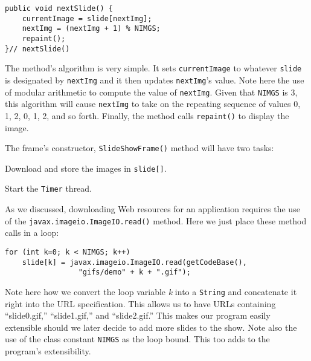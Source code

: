 \begin{jjjlisting}
\begin{lstlisting}
public void nextSlide() {
    currentImage = slide[nextImg];
    nextImg = (nextImg + 1) % NIMGS;
    repaint();
}// nextSlide()
\end{lstlisting}
\end{jjjlisting}

\noindent The method's algorithm is very simple.  It sets
{\tt currentImage} to whatever {\tt slide} is designated by
{\tt nextImg} and it then updates {\tt nextImg}'s value.   Note here the use
of modular arithmetic to compute the value of {\tt nextImg}. Given
that {\tt NIMGS} is 3, this algorithm will cause {\tt nextImg} to take
on the repeating sequence of values 0, 1, 2, 0, 1, 2, and so forth.
Finally, the method calls {\tt repaint()} to display the image.


\noindent The frame's constructor, {\tt SlideShowFrame()} method will have two tasks:

\begin{BL}
\item  Download and store the images in {\tt slide[]}.
\item  Start the {\tt Timer} thread.
\end{BL}

\noindent As we discussed, downloading Web resources for an 
application requires
the use of the {\tt javax.imageio.ImageIO.read()} method. Here we just place these
method calls in a loop:

\begin{jjjlisting}
\begin{lstlisting}
for (int k=0; k < NIMGS; k++) 
    slide[k] = javax.imageio.ImageIO.read(getCodeBase(), 
                 "gifs/demo" + k + ".gif");
\end{lstlisting}
\end{jjjlisting}

\noindent Note here how we convert the loop variable
{\it k} into a {\tt String} and concatenate it right into the URL
specification.  This allows us to have URLs containing ``slide0.gif,''
``slide1.gif,'' and ``slide2.gif.'' This makes our program easily extensible
should we later decide to add more slides to the show.   Note also the
use of the class constant {\tt NIMGS} as the loop bound.  This too adds
to the program's extensibility.

